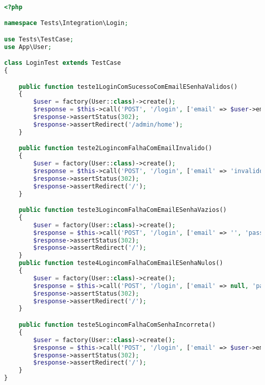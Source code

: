 \begin{lstlisting}[language=PHP, caption= Scripts de teste de Login, nolol,
label={code:LoginTest}]

<?php

namespace Tests\Integration\Login;

use Tests\TestCase;
use App\User;

class LoginTest extends TestCase
{

    public function teste1LoginComSucessoComEmailESenhaValidos()
    {
        $user = factory(User::class)->create();
        $response = $this->call('POST', '/login', ['email' => $user->email, 'password' => 'teste@123']);
        $response->assertStatus(302);
        $response->assertRedirect('/admin/home');
    }

    public function teste2LogincomFalhaComEmailInvalido()
    {
        $user = factory(User::class)->create();
        $response = $this->call('POST', '/login', ['email' => 'invalido@email.com', 'password' => 'teste@123']);
        $response->assertStatus(302);
        $response->assertRedirect('/');
    }

    public function teste3LogincomFalhaComEmailESenhaVazios()
    {
        $user = factory(User::class)->create();
        $response = $this->call('POST', '/login', ['email' => '', 'password' => '']);
        $response->assertStatus(302);
        $response->assertRedirect('/');
    }
    public function teste4LogincomFalhaComEmailESenhaNulos()
    {
        $user = factory(User::class)->create();
        $response = $this->call('POST', '/login', ['email' => null, 'password' => null]);
        $response->assertStatus(302);
        $response->assertRedirect('/');
    }

    public function teste5LogincomFalhaComSenhaIncorreta()
    {
        $user = factory(User::class)->create();
        $response = $this->call('POST', '/login', ['email' => $user->email, 'password' => 'wrongpassowrd']);
        $response->assertStatus(302);
        $response->assertRedirect('/');
    }
}
    
\end{lstlisting}

